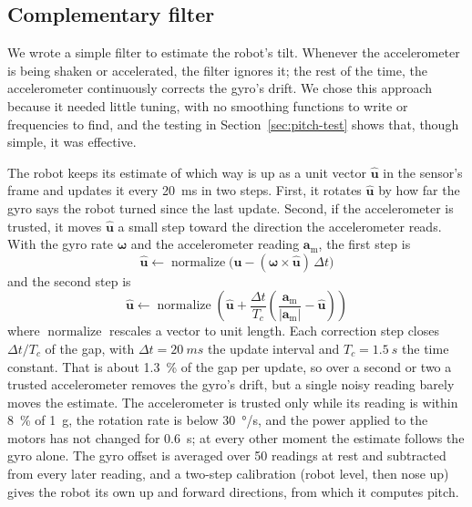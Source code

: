 \subsection{Complementary filter}
\label{sec:filter}

We wrote a simple filter to estimate the robot's tilt. Whenever the accelerometer is being shaken or accelerated, the filter ignores it; the rest of the time, the accelerometer continuously corrects the gyro's drift. We chose this approach because it needed little tuning, with no smoothing functions to write or frequencies to find, and the testing in Section~\ref{sec:pitch-test} shows that, though simple, it was effective.

The robot keeps its estimate of which way is up as a unit vector $\hat{\bm{u}}$ in the sensor's frame and updates it every \qty{20}{ms} in two steps. First, it rotates $\hat{\bm{u}}$ by how far the gyro says the robot turned since the last update. Second, if the accelerometer is trusted, it moves $\hat{\bm{u}}$ a small step toward the direction the accelerometer reads. With the gyro rate $\bm{\omega}$ and the accelerometer reading $\bm{a}_\mathrm{m}$, the first step is
\begin{equation}
  \hat{\bm{u}} \leftarrow \operatorname{normalize}\!\big(\hat{\bm{u}} - (\bm{\omega} \times \hat{\bm{u}})\,\Delta t\big)
  \label{eq:gyro-step}
\end{equation}
and the second step is
\begin{equation}
  \hat{\bm{u}} \leftarrow \operatorname{normalize}\!\left(\hat{\bm{u}} + \frac{\Delta t}{T_c}\left(\frac{\bm{a}_\mathrm{m}}{|\bm{a}_\mathrm{m}|} - \hat{\bm{u}}\right)\right)
  \label{eq:accel-step}
\end{equation}
where $\operatorname{normalize}$ rescales a vector to unit length. Each correction step closes $\Delta t / T_c$ of the gap, with $\Delta t = \qty{20}{ms}$ the update interval and $T_c = \qty{1.5}{s}$ the time constant. That is about \qty{1.3}{\percent} of the gap per update, so over a second or two a trusted accelerometer removes the gyro's drift, but a single noisy reading barely moves the estimate. The accelerometer is trusted only while its reading is within \qty{8}{\percent} of \qty{1}{g}, the rotation rate is below \qty{30}{\degree/s}, and the power applied to the motors has not changed for \qty{0.6}{s}; at every other moment the estimate follows the gyro alone. The gyro offset is averaged over 50 readings at rest and subtracted from every later reading, and a two-step calibration (robot level, then nose up) gives the robot its own up and forward directions, from which it computes pitch.

